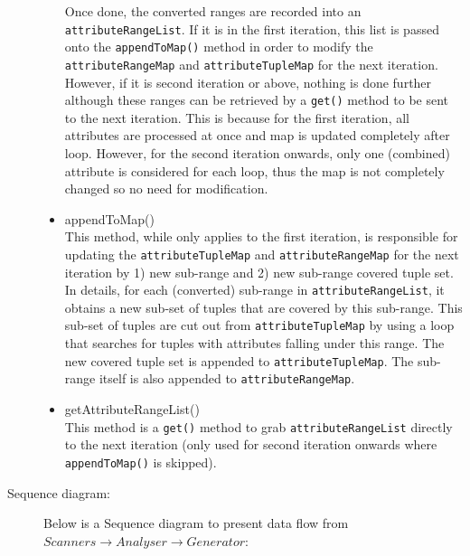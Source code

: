 \begin{description}
\begin{itemize}
	Once done, the converted ranges are recorded into an \texttt{attributeRangeList}. If it is in the first iteration, this list is passed onto the \texttt{appendToMap()} method in order to modify the \texttt{attributeRangeMap} and \texttt{attributeTupleMap} for the next iteration. However, if it is second iteration or above, nothing is done further although these ranges can be retrieved by a \texttt{get()} method to be sent to the next iteration. This is because for the first iteration, all attributes are processed at once and map is updated completely after loop. However, for the second iteration onwards, only one (combined) attribute is considered for each loop, thus the map is not completely changed so no need for modification. 
	
	\item{appendToMap()} \\
	This method, while only applies to the first iteration, is responsible for updating the \texttt{attributeTupleMap} and \texttt{attributeRangeMap} for the next iteration by 1) new sub-range and 2) new sub-range covered tuple set. In details, for each (converted) sub-range in \texttt{attributeRangeList}, it obtains a new sub-set of tuples that are covered by this sub-range. This sub-set of tuples are cut out from \texttt{attributeTupleMap} by using a loop that searches for tuples with attributes falling under this range. The new covered tuple set is appended to \texttt{attributeTupleMap}. The sub-range itself is also appended to \texttt{attributeRangeMap}. 
	
	\item{getAttributeRangeList()} \\
	This method is a \texttt{get()} method to grab \texttt{attributeRangeList} directly to the next iteration (only used for second iteration onwards where \texttt{appendToMap()} is skipped). 
	
\end{itemize}

\item[Sequence diagram: ] 
Below is a Sequence diagram to present data flow from $Scanners \rightarrow Analyser \rightarrow Generator$:


\end{description}
